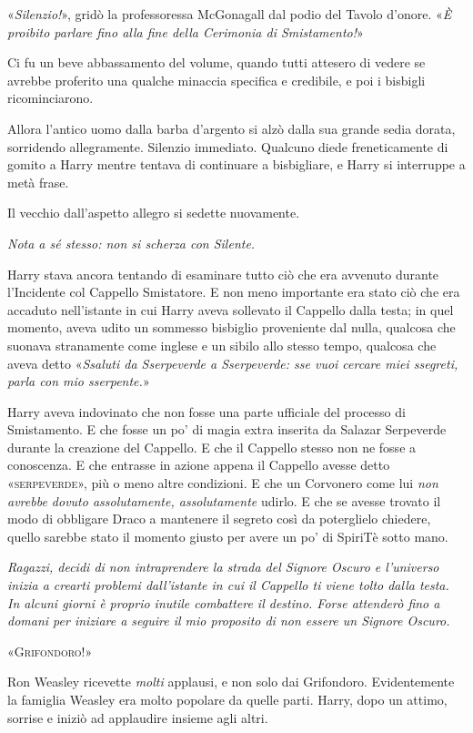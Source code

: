 «\textit{Silenzio!}», gridò la professoressa McGonagall dal podio del Tavolo d’onore. «\textit{È proibito parlare fino alla fine della Cerimonia di Smistamento!}»

Ci fu un beve abbassamento del volume, quando tutti attesero di vedere se avrebbe proferito una qualche minaccia specifica e credibile, e poi i bisbigli ricominciarono.

Allora l’antico uomo dalla barba d’argento si alzò dalla sua grande sedia dorata, sorridendo allegramente. Silenzio immediato. Qualcuno diede freneticamente di gomito a Harry mentre tentava di continuare a bisbigliare, e Harry si interruppe a metà frase.

Il vecchio dall’aspetto allegro si sedette nuovamente.

\textit{Nota a sé stesso: non si scherza con Silente.}

Harry stava ancora tentando di esaminare tutto ciò che era avvenuto durante l’Incidente col Cappello Smistatore. E non meno importante era stato ciò che era accaduto nell’istante in cui Harry aveva sollevato il Cappello dalla testa; in quel momento, aveva udito un sommesso bisbiglio proveniente dal nulla, qualcosa che suonava stranamente come inglese e un sibilo allo stesso tempo, qualcosa che aveva detto «\textit{Ssaluti da Sserpeverde a Sserpeverde: sse vuoi cercare miei ssegreti, parla con mio sserpente.}»

Harry aveva indovinato che non fosse una parte ufficiale del processo di Smistamento. E che fosse un po’ di magia extra inserita da Salazar Serpeverde durante la creazione del Cappello. E che il Cappello stesso non ne fosse a conoscenza. E che entrasse in azione appena il Cappello avesse detto «\textsc{serpeverde}», più o meno altre condizioni. E che un Corvonero come lui \textit{non avrebbe dovuto assolutamente, assolutamente} udirlo. E che se avesse trovato il modo di obbligare Draco a mantenere il segreto così da poterglielo chiedere, quello sarebbe stato il momento giusto per avere un po’ di SpiriTè sotto mano.

\textit{Ragazzi, decidi di non intraprendere la strada del Signore Oscuro e l’universo inizia a crearti problemi dall’istante in cui il Cappello ti viene tolto dalla testa. In alcuni giorni è proprio inutile combattere il destino. Forse attenderò fino a domani per iniziare a seguire il mio proposito di non essere un Signore Oscuro.}

«\textsc{Grifondoro!}»

Ron Weasley ricevette \textit{molti} applausi, e non solo dai Grifondoro. Evidentemente la famiglia Weasley era molto popolare da quelle parti. Harry, dopo un attimo, sorrise e iniziò ad applaudire insieme agli altri.

